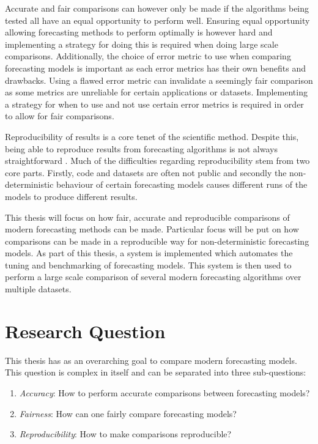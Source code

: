 Accurate and fair comparisons can however only be made if the algorithms being tested all have an equal opportunity to perform well. Ensuring equal opportunity allowing forecasting methods to perform optimally is however hard and implementing a strategy for doing this is required when doing large scale comparisons. Additionally, the choice of error metric to use when comparing forecasting models is important as each error metrics has their own benefits and drawbacks. Using a flawed error metric can invalidate a seemingly fair comparison as some metrics are unreliable for certain applications or datasets. Implementing a strategy for when to use and not use certain error metrics is required in order to allow for fair comparisons.

Reproducibility of results is a core tenet of the scientific method. Despite this, being able to reproduce results from forecasting algorithms is not always straightforward \cite{makridakis_m4_2020}. Much of the difficulties regarding reproducibility stem from two core parts. Firstly, code and datasets are often not public and secondly the non-deterministic behaviour of certain forecasting models causes different runs of the models to produce different results. 

This thesis will focus on how fair, accurate and reproducible comparisons of modern forecasting methods can be made. Particular focus will be put on how comparisons can be made in a reproducible way for non-deterministic forecasting models. As part of this thesis, a system is implemented which automates the tuning and benchmarking of forecasting models. This system is then used to perform a large scale comparison of several modern forecasting algorithms over multiple datasets.

\section{Research Question}
This thesis has as an overarching goal to compare modern forecasting models. This question is complex in itself and can be separated into three sub-questions:

\begin{enumerate}
\item \textit{Accuracy}: How to perform accurate comparisons between forecasting models?
\item \textit{Fairness}: How can one fairly compare forecasting models?
\item \textit{Reproducibility}: How to make comparisons reproducible? 
\end{enumerate}

